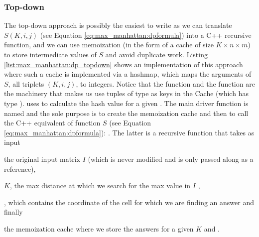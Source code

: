 \subsubsection{Top-down}
\label{sec:max_manhattan:topdown}
The top-down approach is possibly the easiest to write as we can translate $S(K,i,j)$ (see Equation
\ref{eq:max_manhattan:dpformula}) into a C++ recursive function, and we can use memoization (in the
form of a cache of size $K\times n\times m$) to store intermediate values of $S$ and avoid duplicate
work. Listing \ref{list:max_manhattan:dp_topdown} shows an implementation of this approach where
such a cache is implemented via a hashmap, which maps the arguments of $S$, all triplets $(K,i,j)$,
to integers. Notice that the function  and the function  are
the machinery that makes us use tuples of type  as keys in the Cache
(which has type ).  uses  to
calculate the hash value for a given . The main driver function is
named  and the sole purpose is to create the
memoization cache and then to call the C++ equivalent of function $S$ (see Equation
\ref{eq:max_manhattan:dpformula}): . The
latter is a recursive function that takes as input
\begin{enumerate*}
    \item the original input matrix $I$ (which is never modified and is only passed along as a
    reference),
    \item $K$, the max distance at which we search for the max value in $I$ ,
    \item {}, which contains the coordinate of the cell for which we are finding an
    answer and finally
    \item the memoization cache where we store the answers for a given $K$ and .
\end{enumerate*}

